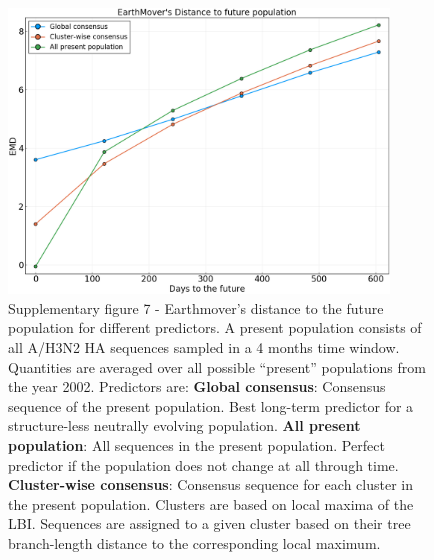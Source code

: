 \documentclass[reprint,amsmath,amssymb,superscriptaddress,showpacs,pre]{revtex4-1}
\begin{document}
	\begin{figure}
		\centering
		\includegraphics[width=0.9\textwidth]{SM_figures/EMD_to_future.png}
		\caption{Supplementary figure 7 - Earthmover's distance to the future population for different predictors. A present population consists of all A/H3N2 HA sequences sampled in a 4 months time window. Quantities are averaged over all possible ``present'' populations from the year 2002. Predictors are: \textbf{Global consensus}: Consensus sequence of the present population. Best long-term predictor for a structure-less neutrally evolving population. \textbf{All present population}: All sequences in the present population. Perfect predictor if the population does not change at all through time. \textbf{Cluster-wise consensus}: Consensus sequence for each cluster in the present population. Clusters are based on local maxima of the LBI. Sequences are assigned to a given cluster based on their tree branch-length distance to the corresponding local maximum.}
		\label{fig:emd_to_future}
	\end{figure}
\end{document}

